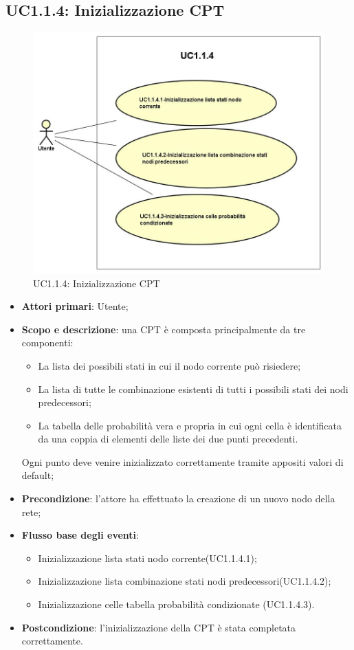 \subsection{UC1.1.4: Inizializzazione CPT} 
\hypertarget{UC1.1.4}{} 
\begin{figure} [H]
	\centering
	\includegraphics[scale=0.45]{Img/UC1-1-4} 
	\caption{UC1.1.4: Inizializzazione CPT} \label{} 
\end{figure} 
\begin{itemize} 
	\item{\textbf{Attori primari}: Utente;} 
	\item{\textbf{Scopo e descrizione}: una CPT è composta principalmente da tre componenti: 
		\begin{itemize} 
			\item{La lista dei possibili stati in cui il nodo corrente può risiedere;} 
			\item{La lista di tutte le combinazione esistenti di tutti i possibili stati dei nodi predecessori;} 
			\item{La tabella delle probabilità vera e propria in cui ogni cella è identificata da una coppia di elementi delle liste dei due punti precedenti.} 
		\end{itemize} 			
		Ogni punto deve venire inizializzato correttamente tramite appositi valori di default;
	} 
	\item{\textbf{Precondizione}: l'attore ha effettuato la creazione di un nuovo nodo della rete;} 
	\item{\textbf{Flusso base degli eventi}: } 
	\begin{itemize} 
		\item{Inizializzazione lista stati nodo corrente(UC1.1.4.1);} 
		\item{Inizializzazione lista combinazione stati nodi predecessori(UC1.1.4.2);} 
		\item{Inizializzazione celle tabella probabilità condizionate (UC1.1.4.3).} 
	\end{itemize} 
	\item{\textbf{Postcondizione}: l'inizializzazione della CPT è stata completata correttamente.} 
\end{itemize} 
